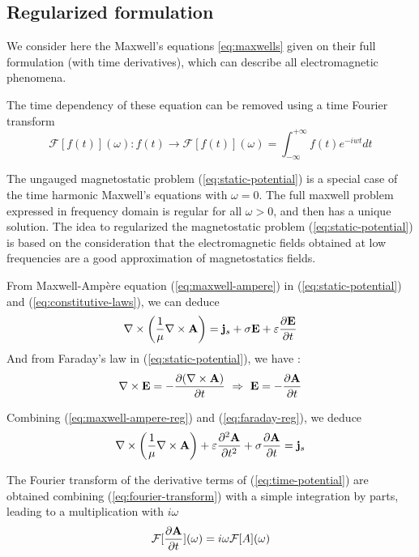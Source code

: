 \subsection{Regularized formulation}
\label{sec:regul-maxwell}
We consider here the Maxwell's equations
\eqref{eq:maxwells} given on their full formulation
(with time derivatives), which can describe all electromagnetic phenomena.

The time dependency of these equation can be removed using a time Fourier
transform
\begin{equation}
  \label{eq:fourier-transform}
  \mathcal{F}[f(t)](\omega) : f(t) \longrightarrow \mathcal{F}[f(t)](\omega)
  = \int_{-\infty}^{+\infty} f(t) e^{-iwt} dt
\end{equation}

The ungauged magnetostatic problem (\ref{eq:static-potential}) is a special case
of the time harmonic Maxwell's equations with $\omega = 0$. The full maxwell
problem expressed in frequency domain is regular for all $\omega > 0$, and then
has a unique solution. The idea to regularized the magnetostatic problem
(\ref{eq:static-potential}) is based on the consideration that the
electromagnetic fields obtained at low frequencies are a good approximation of
magnetostatics fields.

From Maxwell-Ampère equation (\ref{eq:maxwell-ampere}) in
(\ref{eq:static-potential}) and (\ref{eq:constitutive-laws}), we can deduce
\begin{equation}
  \label{eq:maxwell-ampere-reg}
  \nabla \times \left( \frac{1}{\mu} \nabla \times \mathbf{A} \right)
  = \mathbf{j}_s + \sigma \mathbf{E} + \varepsilon \frac{\partial \mathbf{E}}{\partial t}
\end{equation}
And from Faraday's law in (\ref{eq:static-potential}), we have :
\begin{equation}
  \label{eq:faraday-reg}
  \nabla \times \mathbf{E} = -\frac{\partial (\nabla \times \mathbf{A}) }{\partial t}
  ~\Rightarrow ~\mathbf{E} = -\frac{\partial \mathbf{A}}{\partial t}
\end{equation}

Combining (\ref{eq:maxwell-ampere-reg}) and (\ref{eq:faraday-reg}), we deduce
\begin{equation}
  \label{eq:time-potential}
  \nabla \times \left( \frac{1}{\mu} \nabla \times \mathbf{A} \right)
  + \varepsilon \frac{\partial^2 \mathbf{A}}{\partial t^2}
  + \sigma \frac{\partial \mathbf{A}}{\partial t}
  = \mathbf{j}_s
\end{equation}

The Fourier transform of the derivative terms of (\ref{eq:time-potential}) are
obtained combining (\ref{eq:fourier-transform}) with a simple integration by
parts, leading to a multiplication with $i \omega$
\begin{equation*}
  \mathcal{F}[\frac{\partial \mathbf{A}}{\partial t}](\omega)
  = i \omega \mathcal{F}[A](\omega)
\end{equation*}

